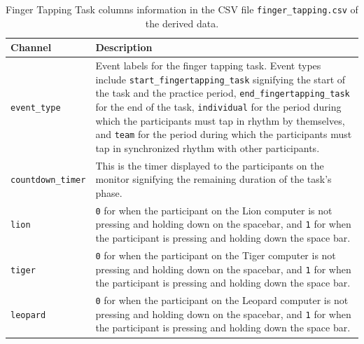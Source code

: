 \begin{table}[h]
\centering
\begin{tabularx}{\textwidth}{lX}
    \toprule
Channel & Description \\
\midrule
\texttt{event\_type} & Event labels for the finger tapping task. Event types include \texttt{start\_fingertapping\_task} signifying the start of the task and the practice period, \texttt{end\_fingertapping\_task} for the end of the task, \texttt{individual} for the period during which the participants must tap in rhythm by themselves, and \texttt{team} for the period during which the participants must tap in synchronized rhythm with other participants.\\
\texttt{countdown\_timer} & This is the timer displayed to the participants on the monitor signifying the remaining duration of the task's phase.\\
\texttt{lion} & \texttt{0} for when the participant on the Lion computer is not pressing and holding down on the spacebar, and \texttt{1} for when the participant is pressing and holding down the space bar.\\
\texttt{tiger} & \texttt{0} for when the participant on the Tiger computer is not pressing and holding down on the spacebar, and \texttt{1} for when the participant is pressing and holding down the space bar.\\
\texttt{leopard} & \texttt{0} for when the participant on the Leopard computer is not pressing and holding down on the spacebar, and \texttt{1} for when the participant is pressing and holding down the space bar.\\
\bottomrule
\end{tabularx}
\caption{Finger Tapping Task columns information in the CSV file \texttt{finger\_tapping.csv} of the derived data.}
\label{tab:finger_task_columns}
\end{table}

